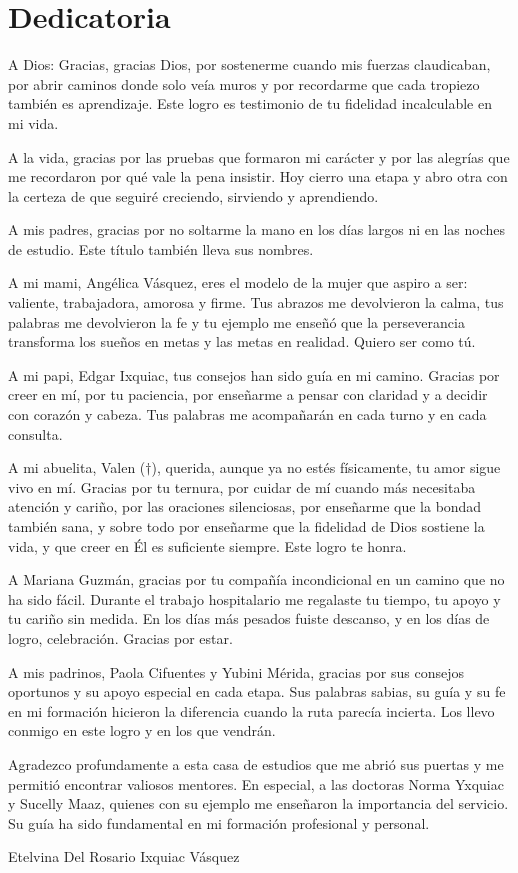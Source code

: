\chapter*{Dedicatoria}
A Dios: Gracias, gracias Dios, por sostenerme cuando mis fuerzas claudicaban, 
por abrir caminos donde solo veía muros y por recordarme que cada tropiezo 
también es aprendizaje. Este logro es testimonio de tu fidelidad incalculable 
en mi vida.

A la vida, gracias por las pruebas que formaron mi carácter y por las alegrías 
que me recordaron por qué vale la pena insistir. Hoy cierro una etapa y abro 
otra con la certeza de que seguiré creciendo, sirviendo y aprendiendo.

A mis padres, gracias por no soltarme la mano en los días largos ni en las 
noches de estudio. Este título también lleva sus nombres.

A mi mami, Angélica Vásquez, eres el modelo de la mujer que aspiro a ser: 
valiente, trabajadora, amorosa y firme. Tus abrazos me devolvieron la calma, 
tus palabras me devolvieron la fe y tu ejemplo me enseñó que la perseverancia 
transforma los sueños en metas y las metas en realidad. Quiero ser como tú.

A mi papi, Edgar Ixquiac, tus consejos han sido guía en mi camino. Gracias por 
creer en mí, por tu paciencia, por enseñarme a pensar con claridad y a decidir 
con corazón y cabeza. Tus palabras me acompañarán en cada turno y en cada 
consulta.

A mi abuelita, Valen ($\dagger$), querida, aunque ya no estés físicamente, tu 
amor sigue vivo en mí. Gracias por tu ternura, por cuidar de mí cuando más 
necesitaba atención y cariño, por las oraciones silenciosas, por enseñarme que 
la bondad también sana, y sobre todo por enseñarme que la fidelidad de Dios 
sostiene la vida, y que creer en Él es suficiente siempre. Este logro te honra.

A Mariana Guzmán, gracias por tu compañía incondicional en un camino que no ha 
sido fácil. Durante el trabajo hospitalario me regalaste tu tiempo, tu apoyo y 
tu cariño sin medida. En los días más pesados fuiste descanso, y en los días 
de logro, celebración. Gracias por estar.

A mis padrinos, Paola Cifuentes y Yubini Mérida, gracias por sus consejos 
oportunos y su apoyo especial en cada etapa. Sus palabras sabias, su guía y su 
fe en mi formación hicieron la diferencia cuando la ruta parecía incierta. Los 
llevo conmigo en este logro y en los que vendrán.

Agradezco profundamente a esta casa de estudios que me abrió sus puertas y me 
permitió encontrar valiosos mentores. En especial, a las doctoras Norma Yxquiac 
y Sucelly Maaz, quienes con su ejemplo me enseñaron la importancia del servicio. 
Su guía ha sido fundamental en mi formación profesional y personal.

\begin{flushright}
Etelvina Del Rosario Ixquiac Vásquez
\end{flushright}
